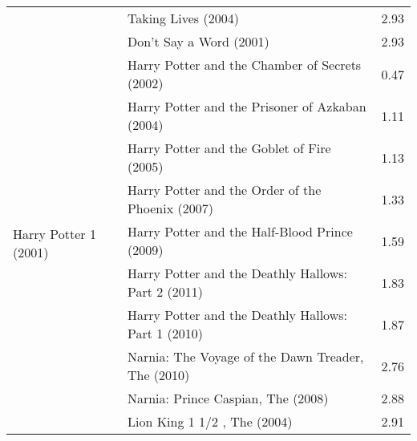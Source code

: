 \begin{table}[H]
\begin{tabular}{ |l|l|l| }
		 &  Taking Lives (2004)  &  2.93  \\
		 &  Don't Say a Word (2001)  &  2.93  \\
		\hline
		\multirow{10}{*}{ Harry Potter 1 (2001) } &  Harry Potter and the Chamber of Secrets (2002)  &  0.47  \\
		 &  Harry Potter and the Prisoner of Azkaban (2004)  &  1.11  \\
		 &  Harry Potter and the Goblet of Fire (2005)  &  1.13  \\
		 &  Harry Potter and the Order of the Phoenix (2007)  &  1.33  \\
		 &  Harry Potter and the Half-Blood Prince (2009)  &  1.59  \\
		 &  Harry Potter and the Deathly Hallows: Part 2 (2011)  &  1.83  \\
		 &  Harry Potter and the Deathly Hallows: Part 1 (2010)  &  1.87  \\
		 &  Narnia: The Voyage of the Dawn Treader, The (2010)  &  2.76  \\
		 &  Narnia: Prince Caspian, The (2008)  &  2.88  \\
		 &  Lion King 1 1/2 , The (2004)  &  2.91  \\
		\hline
	\end{tabular}
\end{table}


